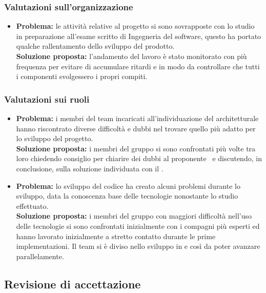 \subsubsection{Valutazioni sull'organizzazione}
\begin{itemize}
	\item \textbf{Problema:} le attività relative al progetto si sono sovrapposte con lo studio in preparazione all'esame scritto di Ingegneria del software, questo ha portato qualche rallentamento dello sviluppo del prodotto.\\
	\textbf{Soluzione proposta:} l'andamento del lavoro è stato monitorato con più frequenza per evitare di accumulare ritardi e in modo da controllare che tutti i componenti svolgessero i propri compiti.
\end{itemize}
\subsubsection{Valutazioni sui ruoli}
\begin{itemize}
	\item \textbf{Problema:} i membri del team incaricati all'individuazione del  architetturale hanno riscontrato diverse difficoltà e dubbi nel trovare quello più adatto per lo sviluppo del progetto.\\
	\textbf{Soluzione proposta:} i membri del gruppo si sono confrontati più volte tra loro chiedendo consiglio per chiarire dei dubbi al proponente \Proponente\ e discutendo, in conclusione, sulla soluzione individuata con il \CR{}.
\end{itemize}
\begin{itemize}
	\item \textbf{Problema:} lo sviluppo del codice ha creato alcuni problemi durante lo sviluppo, data la conoscenza base delle tecnologie nonostante lo studio effettuato.\\
	\textbf{Soluzione proposta:} i membri del gruppo con maggiori difficoltà nell'uso delle tecnologie si sono confrontati inizialmente con i compagni più esperti ed hanno lavorato inizialmente a stretto contatto durante le prime implementazioni. Il team si è diviso nello sviluppo in  e  così da poter avanzare parallelamente.
\end{itemize}
\subsection{Revisione di accettazione} \label{MiglioramentoRA}
